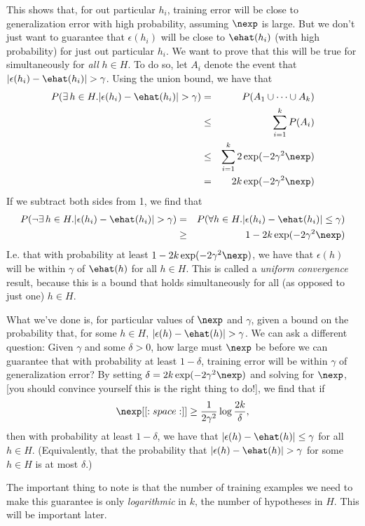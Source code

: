 This shows that, for out particular $h_i$, training error will be close
to generalization error with high probability, assuming $\nexp$ is large. 
But we don't just want to guarantee that $\epsilon(h_i)$ will be close to $\ehat(h_i)$ (with
high probability) for just out particular $h_i$.  We want to prove that this will be true
for simultaneously for \emph{all} $h \in H$.  To do so, let $A_i$ denote the event that 
$|\epsilon(h_i) - \ehat(h_i)| > \gamma$.  Using the union bound, we have
that
\begin{eqnarray*}
P(\exists\, h \in H. |\epsilon(h_i) - \ehat(h_i)| > \gamma)
&=& P(A_1 \cup \cdots \cup A_k) \\
&\leq& \sum_{i=1}^k P(A_i) \\ 
&\leq& \sum_{i=1}^k 2\exp(-2\gamma^2\nexp)\\
&=& 2k\exp(-2\gamma^2\nexp)
\end{eqnarray*}
If we subtract both sides from 1, we find that 
\begin{eqnarray*}
P(\neg \exists\, h \in H. |\epsilon(h_i) - \ehat(h_i)| > \gamma) 
&=& P(\forall h \in H. |\epsilon(h_i) - \ehat(h_i)| \leq \gamma) \\
&\geq& 1-2k\exp(-2\gamma^2\nexp)
\end{eqnarray*}
I.e. that with probability at least $1-2k\exp(-2\gamma^2\nexp)$, we have that
$\epsilon(h)$ will be within $\gamma$ of $\ehat(h)$ for all $h \in H$.  This is
called a \emph{uniform convergence} result, because this is a bound that holds
simultaneously for all (as opposed to just one) $h \in H$.

What we've done is, for particular values of $\nexp$ and $\gamma$, given a bound on
the probability that, for some $h \in H$,  $|\epsilon(h) - \ehat(h)| > \gamma$.
We
can ask a different question: Given $\gamma$ and some $\delta > 0$, how large must $\nexp$
be before we can guarantee that with probability at least $1-\delta$, training
error will be within $\gamma$ of generalization error? 
By setting $\delta = 2k\exp(-2\gamma^2\nexp)$ and solving for $\nexp$,
[you should convince yourself this is the right thing to do!], 
we find that if 
\[
\nexp[[:space:]]\geq \frac{1}{2\gamma^2} \log \frac{2k}{\delta},
\]
then with probability at least $1-\delta$,  we have that $|\epsilon(h) - \ehat(h)| \leq \gamma$ 
for all $h \in H$.  (Equivalently, that the probability that 
$|\epsilon(h) - \ehat(h)| > \gamma$ for some $h \in H$ is at most $\delta$.)

The important thing to note is that the number of training examples we need to make
this guarantee is only \emph{logarithmic} in $k$, the number of hypotheses in $H$.  This will
be important later. 

